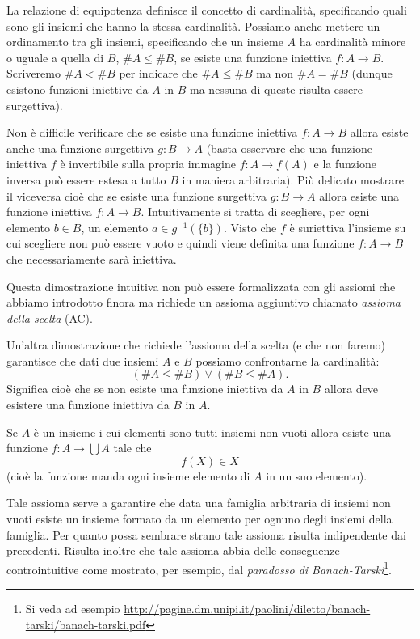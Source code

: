\documentclass[italian,a4paper,hidelinks,headinclude]{scrartcl}
\newcommand{\myemph}[1]{\emph{#1}\marginpar{#1}}
\begin{document}
La relazione di equipotenza definisce il concetto di cardinalità, specificando
quali sono gli insiemi che hanno la stessa cardinalità. Possiamo anche mettere
un ordinamento tra gli insiemi, specificando che un insieme $A$ ha cardinalità
minore o uguale a quella di $B$, $\#A\le \#B$, se esiste una funzione
iniettiva $f\colon A \to B$. Scriveremo $\#A < \#B$ per indicare che
$\#A \le \#B$ ma non $\#A = \#B$ (dunque esistono funzioni iniettive da $A$ in $B$
ma nessuna di queste risulta essere surgettiva).

Non è difficile verificare che se esiste una funzione iniettiva $f\colon A\to B$
allora esiste anche una funzione surgettiva $g\colon B\to A$
(basta osservare che una funzione iniettiva $f$ è invertibile sulla propria
immagine $f\colon A \to f(A)$ e la funzione inversa può essere estesa a
tutto $B$ in maniera arbitraria).
Più delicato mostrare il viceversa cioè che se esiste una funzione surgettiva
$g\colon B \to A$ allora esiste una funzione iniettiva $f\colon A \to B$.
Intuitivamente si tratta di scegliere, per ogni elemento $b\in B$, un elemento
$a\in g^{-1}(\{b\})$. Visto che $f$ è suriettiva l'insieme su cui scegliere non
può essere vuoto e quindi viene definita una funzione $f\colon A \to B$ che
necessariamente sarà iniettiva.

Questa dimostrazione intuitiva non può essere formalizzata con gli assiomi che
abbiamo introdotto finora ma richiede un assioma aggiuntivo chiamato
\myemph{assioma della scelta} (AC).

Un'altra dimostrazione che richiede l'assioma della scelta (e che non faremo)
garantisce che dati due insiemi $A$ e $B$ possiamo confrontarne la cardinalità:
\[
  (\#A \le \#B) \lor (\#B \le \#A).
\]
Significa cioè che se non esiste una funzione iniettiva da $A$ in $B$ allora
deve esistere una funzione iniettiva da $B$ in $A$.

\begin{axiom}
  Se $A$ è un insieme i cui elementi sono tutti insiemi non vuoti allora
  esiste una funzione $f\colon A \to \bigcup A$ tale che
  \[
    f(X) \in X
  \]
  (cioè la funzione manda ogni insieme elemento di $A$ in un suo elemento).
\end{axiom}

Tale assioma serve a garantire che data una famiglia arbitraria di insiemi
non vuoti esiste un insieme formato da un elemento per ognuno degli insiemi
della famiglia. Per quanto possa sembrare strano tale assioma risulta
indipendente dai precedenti. Risulta inoltre che tale assioma abbia delle
conseguenze controintuitive come mostrato, per esempio, dal
\myemph{paradosso di Banach-Tarski}\footnote{%
Si veda ad esempio \url{http://pagine.dm.unipi.it/paolini/diletto/banach-tarski/banach-tarski.pdf}%
}.
\end{document}
